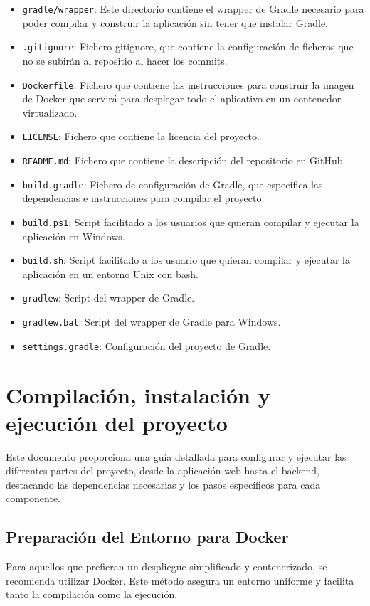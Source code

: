 \begin{itemize}
    \item \verb|gradle/wrapper|: 
    Este directorio contiene el wrapper de Gradle necesario para poder compilar y construir la aplicación sin tener que instalar Gradle.
    \item \verb|.gitignore|: 
    Fichero gitignore, que contiene la configuración de ficheros que no se subirán al repositio al hacer los commits.
    \item \verb|Dockerfile|: 
    Fichero que contiene las instrucciones para construir la imagen de Docker que servirá para desplegar todo el aplicativo en un contenedor virtualizado.
    \item \verb|LICENSE|: 
    Fichero que contiene la licencia del proyecto.
    \item \verb|README.md|: 
    Fichero que contiene la descripción del repositorio en GitHub.
    \item \verb|build.gradle|: 
    Fichero de configuración de Gradle, que especifica las dependencias e instrucciones para compilar el proyecto.
    \item \verb|build.ps1|: 
    Script facilitado a los usuarios que quieran compilar y ejecutar la aplicación en Windows.
    \item \verb|build.sh|: 
    Script facilitado a los usuario que quieran compilar y ejecutar la aplicación en un entorno Unix con bash.
    \item \verb|gradlew|: 
    Script del wrapper de Gradle.
    \item \verb|gradlew.bat|: 
    Script del wrapper de Gradle para Windows.
    \item \verb|settings.gradle|: 
    Configuración del proyecto de Gradle.
\end{itemize}
\section{Compilación, instalación y ejecución del proyecto}
Este documento proporciona una guía detallada para configurar y ejecutar las diferentes partes del proyecto, desde la aplicación web hasta el backend, destacando las dependencias necesarias y los pasos específicos para cada componente.
\subsection{Preparación del Entorno para Docker}
Para aquellos que prefieran un despliegue simplificado y contenerizado, se recomienda utilizar Docker. Este método asegura un entorno uniforme y facilita tanto la compilación como la ejecución.
